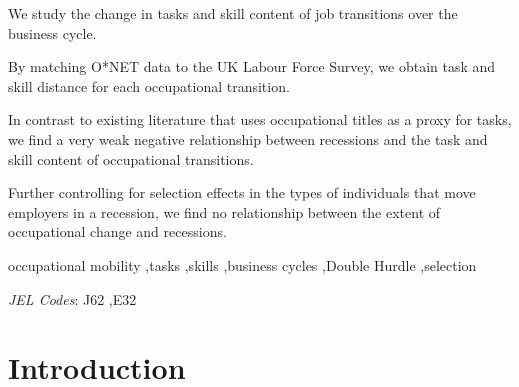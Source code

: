 \documentclass[preprint,12pt,authoryear]{elsarticle}
\begin{document}
\begin{frontmatter}
\begin{abstract}
\end{abstract}


\begin{highlights}
\item We study the change in tasks and skill content of job transitions over the business cycle.
\item By matching O*NET data to the UK Labour Force Survey, we obtain task and skill distance for each occupational transition.
\item In contrast to existing literature that uses occupational titles as a proxy for tasks, we find a very weak negative relationship between recessions and the task and skill content of occupational transitions.
\item Further controlling for selection effects in the types of individuals that move employers in a recession, we find no relationship between the extent of occupational change and recessions.
\end{highlights}

\begin{keyword}
occupational mobility  \sep tasks  \sep skills  \sep business cycles  \sep Double Hurdle  \sep selection



\textit{JEL Codes}: J62 \sep E32

\end{keyword}



\end{frontmatter}


	\section{Introduction}
\label{sec:Introduction}
\end{document}

